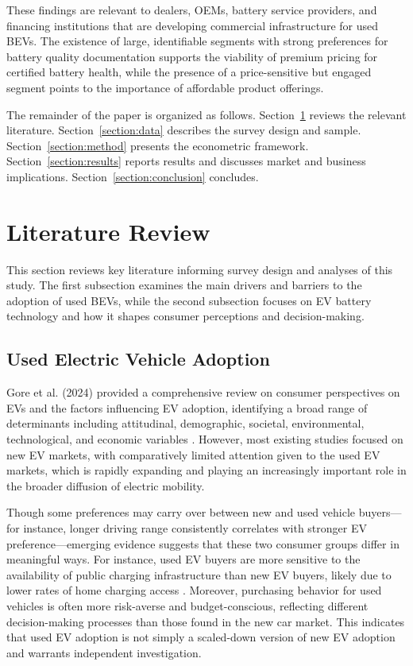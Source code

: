 \documentclass[a4paper,fleqn]{cas-sc}   %
\begin{document}
These findings are relevant to dealers, OEMs, battery service providers, and financing institutions that are developing commercial infrastructure for used BEVs. The existence of large, identifiable segments with strong preferences for battery quality documentation supports the viability of premium pricing for certified battery health, while the presence of a price-sensitive but engaged segment points to the importance of affordable product offerings. 

The remainder of the paper is organized as follows. Section~\ref{section:lit_review} reviews the relevant literature. Section~\ref{section:data} describes the survey design and sample. Section~\ref{section:method} presents the econometric framework. Section~\ref{section:results} reports results and discusses market and business implications. Section~\ref{section:conclusion} concludes.



\section{Literature Review}
\label{section:lit_review}
This section reviews key literature informing survey design and analyses of this study. The first subsection examines the main drivers and barriers to the adoption of used BEVs, while the second subsection focuses on EV battery technology and how it shapes consumer perceptions and decision-making.

\subsection{Used Electric Vehicle Adoption}

Gore et al. (2024) provided a comprehensive review on consumer perspectives on EVs and the factors influencing EV adoption, identifying a broad range of determinants including attitudinal, demographic, societal, environmental, technological, and economic variables \parencite{iogansenDecipheringFactorsAssociated2023a, naseriWhoMoreLikely2024, sonarExaminingCausalFactors2023}. However, most existing studies focused on new EV markets, with comparatively limited attention given to the used EV markets, which is rapidly expanding and playing an increasingly important role in the broader diffusion of electric mobility.

Though some preferences may carry over between new and used vehicle buyers---for instance, longer driving range consistently correlates with stronger EV preference---emerging evidence suggests that these two consumer groups differ in meaningful ways. For instance, used EV buyers are more sensitive to the availability of public charging infrastructure than new EV buyers, likely due to lower rates of home charging access \parencite{zouEffectsChargingInfrastructure2020}. Moreover, purchasing behavior for used vehicles is often more risk-averse and budget-conscious, reflecting different decision-making processes than those found in the new car market. This indicates that used EV adoption is not simply a scaled-down version of new EV adoption and warrants independent investigation.
\end{document}
